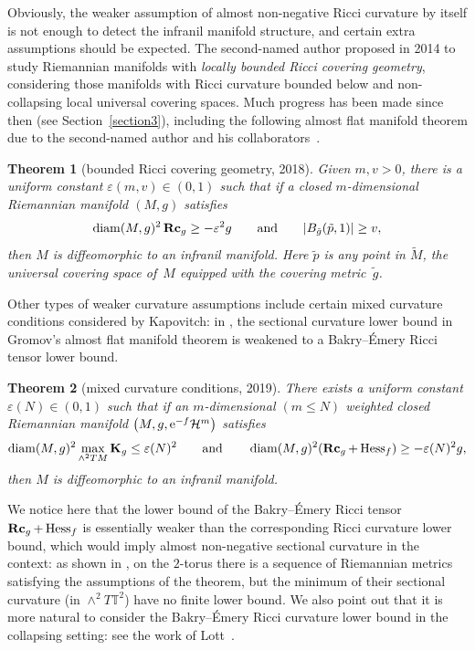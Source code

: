 \documentclass[10pt,a4paper]{amsart}
\numberwithin{equation}{section}
\newtheorem{Theorem}{Theorem}[section]
\DeclareMathOperator{\diam}{diam}
\newcommand{\Rc}{\operatorname{\bf Rc}}
\begin{document}
Obviously, the weaker assumption of almost non-negative Ricci
curvature by itself is not enough to detect the infranil manifold structure, and
certain extra assumptions should be expected. The second-named author proposed
in 2014 to study Riemannian manifolds with \emph{locally bounded Ricci covering
geometry}, considering those manifolds with Ricci curvature bounded below and
non-collapsing local universal covering spaces. Much progress has been made
since then (see Section~\ref{section3}), including the following almost flat manifold theorem due
to the second-named author and his collaborators~\cite{HKRX18}.
 \begin{Theorem}[bounded Ricci covering geometry, 2018]\label{thm:
HKRX18A} Given $m,v>0$, there is a uniform constant $\varepsilon(m,v)\in (0,1)$
such that if a closed $m$-dimensional Riemannian manifold $(M,g)$
sa\-tisfies
\begin{gather*}
\diam(M,g)^2\Rc_g \ge -\varepsilon^2 g\qquad\text{and}\qquad
 |B_{\tilde{g}}(\tilde{p}, 1) | \ge v,
\end{gather*}
then $M$ is diffeomorphic to an infranil manifold. Here $\tilde{p}$ is any
point in $\tilde{M}$, the universal covering space of~$M$ equipped
with the covering metric~$\tilde{g}$.
\end{Theorem}

Other types of weaker curvature assumptions include certain mixed curvature
conditions considered by Kapovitch: in \cite{Kapovitch19}, the sectional
curvature lower bound in Gromov's almost flat manifold theorem is weakened to a
Bakry--\'Emery Ricci tensor lower bound.
\begin{Theorem}[mixed curvature conditions, 2019]\label{thm: Kapovitch19}
There exists a uniform constant $\varepsilon(N) \in (0,1)$ such that if an
$m$-dimensional $(m\le N)$ weighted closed Riemannian manifold $\big(M,g,
{\rm e}^{-f}\mathcal{H}^m\big)$ satisfies
\begin{align*}
\diam(M,g)^2\max_{\wedge^2TM}\mathbf{K}_g \le \varepsilon(N)^2\qquad
\text{and}\qquad \diam(M,g)^2 (\Rc_g+\operatorname{Hess}_f ) \ge -\varepsilon(N)^2g,
\end{align*}
then $M$ is diffeomorphic to an infranil manifold.
\end{Theorem}
We notice here that the lower bound of the Bakry--\'Emery Ricci tensor
$\Rc_g+\operatorname{Hess}_f$ is essentially weaker than the corresponding Ricci curvature
lower bound, which would imply almost non-negative sectional curvature in the
context: as shown in \cite[Lemma~8.1]{Kapovitch19}, on the $2$-torus there is a
sequence of Riemannian metrics satisfying the assumptions of the theorem, but
the minimum of their sectional curvature (in $\wedge^2T\mathbb{T}^2$) have no
finite lower bound.
We also point out that it is more natural to consider the Bakry--\'Emery Ricci
curvature lower bound in the collapsing setting: see the work of Lott~\cite{Lott03}.
\end{document}
